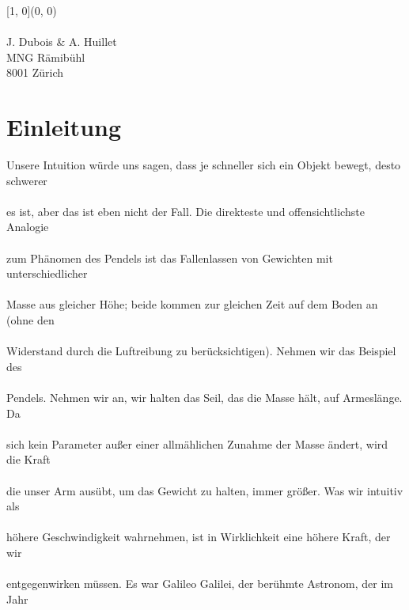 \documentclass[12pt, a4paper, twoside]{article}
\begin{document}
    
    \begin{textblock}{\pgfmathresult}[1, 0](0, 0)
    \noindent
    \\\\ J. Dubois \& A. Huillet\\ MNG Rämibühl\\ 8001 Zürich
    \end{textblock}
    

    \newpage

    \section{Einleitung}
    Unsere Intuition würde uns sagen, dass je schneller sich ein Objekt bewegt, desto schwerer\\\\
    es ist, aber das ist eben nicht der Fall. Die direkteste und offensichtlichste Analogie\\\\
    zum Phänomen des Pendels ist das Fallenlassen von Gewichten mit unterschiedlicher\\\\
    Masse aus gleicher Höhe; beide kommen zur gleichen Zeit auf dem Boden an (ohne den\\\\
    Widerstand durch die Luftreibung zu berücksichtigen). Nehmen wir das Beispiel des \\\\
    Pendels. Nehmen wir an, wir halten das Seil, das die Masse hält, auf Armeslänge. Da\\\\
    sich kein Parameter außer einer allmählichen Zunahme der Masse ändert, wird die Kraft\\\\
    die unser Arm ausübt, um das Gewicht zu halten, immer größer.  Was wir intuitiv als\\\\
    höhere Geschwindigkeit wahrnehmen, ist in Wirklichkeit eine höhere Kraft, der wir \\\\
    entgegenwirken müssen. Es war Galileo Galilei, der berühmte Astronom, der im Jahr\\\\
\end{document}
